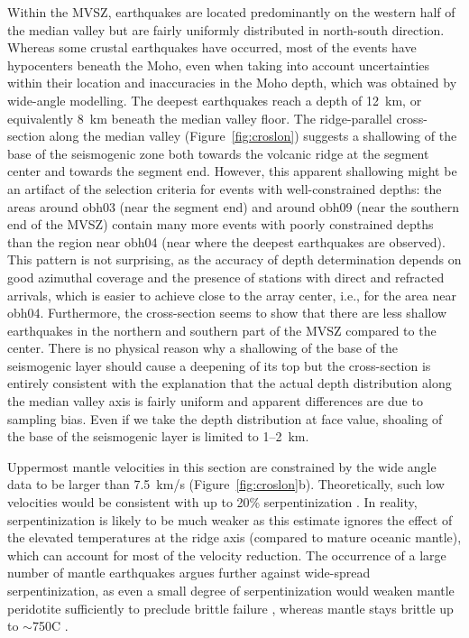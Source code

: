 \documentclass[jgr]{agu2001}
\begin{document}
\begin{article}
Within the MVSZ, earthquakes are located predominantly on the western half of the median valley but are
fairly uniformly distributed in north-south direction.  Whereas some
crustal earthquakes have occurred, most of the events have hypocenters
beneath the Moho, even when taking into account uncertainties within
their location and inaccuracies in the Moho depth, which was obtained
by wide-angle modelling.  The deepest earthquakes reach a depth of 
12~km, or equivalently 8~km beneath the median valley floor. The ridge-parallel cross-section
along the median valley (Figure~\ref{fig:croslon}) suggests a
shallowing of the base of the seismogenic zone both towards the
volcanic ridge at the segment center and towards the segment end.
However, this apparent shallowing might be an artifact of the
selection criteria for events with well-constrained depths: the areas
around obh03 (near the segment end) and around obh09 (near
the southern end of the MVSZ) contain many more
events with poorly constrained depths than the region
near obh04 (near where the deepest earthquakes are observed).  This
pattern is not surprising, as the accuracy of depth determination
depends on good azimuthal coverage and the presence of stations with
direct and refracted arrivals, which is easier to achieve close to the
array center, i.e., for the area near obh04.  Furthermore, the cross-section seems to show that there are less
shallow earthquakes in the northern  and
southern part of the MVSZ compared to the center.  There is no physical reason why a shallowing of
the base of the seismogenic layer should cause a deepening of 
its top but the cross-section is entirely consistent with
the explanation that the actual depth distribution along the median
valley axis is fairly uniform and apparent differences are due to
sampling bias. Even if we take the depth distribution at face value,
shoaling of the base of the seismogenic layer is limited to 1--2~km.
 

Uppermost mantle velocities in this section are constrained by the
 wide angle data to be larger than 7.5~km/s
(Figure~\ref{fig:croslon}b). Theoretically, such low velocities would be
consistent with up to 20\% serpentinization
\citep{oreilly96,christensen66}.  In reality, serpentinization is
likely to be much weaker as this estimate ignores the
effect of the elevated temperatures at the ridge axis (compared to
mature oceanic mantle), which can account for most of the velocity
reduction. The occurrence of a large number of mantle earthquakes
argues further against wide-spread serpentinization, as even a small
degree of serpentinization would weaken mantle peridotite sufficiently
to preclude brittle failure \citep{escartin97a}, whereas mantle stays brittle up to
$\sim$750\dg C \citep{wiens83}.


\end{article}
\end{document}
